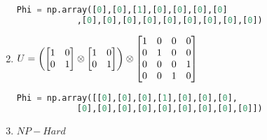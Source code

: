 \documentclass[a4paper]{article}
\begin{document}
\begin{enumerate}[1.]
        \begin{lstlisting}[language=Python]
            Phi = np.array([0],[0],[1],[0],[0],[0],[0]
            ,[0],[0],[0],[0],[0],[0],[0],[0],[0])
        \end{lstlisting}
        \item $U = \left(\begin{bmatrix}1 & 0 \\ 0 & 1\end{bmatrix} \otimes \begin{bmatrix}1 & 0 \\ 0 & 1\end{bmatrix}\right) \otimes \begin{bmatrix}1 & 0 & 0 & 0 \\ 0 & 1 & 0 & 0 \\ 0 & 0 & 0 & 1 \\ 0 & 0 & 1 & 0\end{bmatrix}\\$
        \begin{lstlisting}[language=Python]
            Phi = np.array([[0],[0],[0],[1],[0],[0],[0],
            [0],[0],[0],[0],[0],[0],[0],[0],[0]])
        \end{lstlisting}
        \item $NP - Hard$
    \end{enumerate}
\end{document}
